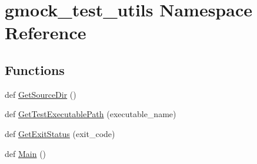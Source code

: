 \hypertarget{namespacegmock__test__utils}{}\section{gmock\+\_\+test\+\_\+utils Namespace Reference}
\label{namespacegmock__test__utils}
\subsection*{Functions}
\begin{DoxyCompactItemize}
\item 
def \hyperlink{namespacegmock__test__utils_ab7217591e655e80392c9db6b99d04765}{Get\+Source\+Dir} ()
\item 
def \hyperlink{namespacegmock__test__utils_aadd2927024e24f0c53f7ba283402cdb1}{Get\+Test\+Executable\+Path} (executable\+\_\+name)
\item 
def \hyperlink{namespacegmock__test__utils_a9146f81ff42389086b3eaee25dbf0263}{Get\+Exit\+Status} (exit\+\_\+code)
\item 
def \hyperlink{namespacegmock__test__utils_ad79dc6aea3727ee23b5f5c454ef0d78a}{Main} ()
\end{DoxyCompactItemize}
